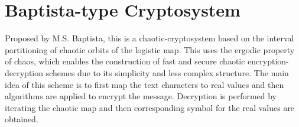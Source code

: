 \section{Baptista-type Cryptosystem}
Proposed by M.S. Baptista, this is a chaotic-cryptosystem based on the interval partitioning of chaotic orbits of the logistic map. This uses the ergodic property of chaos, which enables the construction of fast and secure chaotic encryption-decryption schemes due to its simplicity and
less complex structure. The main idea of this scheme is to first map the text characters to real values and then algorithms are applied to
encrypt the message. Decryption is performed by iterating the chaotic map and then corresponding symbol for the real values are obtained.


